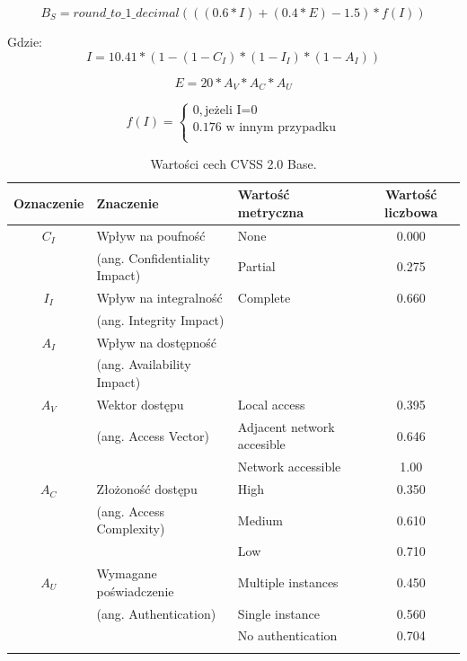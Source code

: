 \begin{equation}
    B_S = round\_to\_1\_decimal(((0.6* I)  +(0.4*E)-1.5)* f(I))
\end{equation}

Gdzie:
\begin{equation}
    I=10.41 * (1 - (1 - C_I) * (1 - I_I) * (1 - A_I))
\end{equation}

\begin{equation}
    E=20 * A_V * A_C * A_U
\end{equation}

\begin{equation}
f(I) = 
\begin{cases}
0,\text{jeżeli I=0} \\
0.176\text{ w innym przypadku} \\
\end{cases}
\end{equation}

\begin{table}[tbh]
\caption{Wartości cech CVSS 2.0 Base.}
\begin{center}
\label{tab:chapter1:cvss_2_property}
\begin{tabular}{cllc}
\hline \noalign {\smallskip}
\textbf{Oznaczenie} & \textbf{Znaczenie} & \textbf{Wartość metryczna} & \textbf{Wartość liczbowa} \\
\hline \noalign {\smallskip}
$C_I$ & Wpływ na poufność         & None          & 0.000 \\
      & (ang. Confidentiality Impact)  & Partial       & 0.275 \\
$I_I$ & Wpływ na integralność     & Complete      & 0.660 \\
      & (ang. Integrity Impact)        &               &       \\
$A_I$ & Wpływ na dostępność       &               &       \\
      & (ang. Availability Impact)     &               &       \\
\hline \noalign {\smallskip}
$A_V$ & Wektor dostępu            & Local access & 0.395 \\
      & (ang. Access Vector)           & Adjacent network accesible & 0.646 \\
      &                           & Network accessible & 1.00 \\
\hline \noalign {\smallskip}
$A_C$ & Złożoność dostępu         & High     & 0.350 \\
      & (ang. Access Complexity)       & Medium	 & 0.610 \\
      &                           & Low	     & 0.710 \\
\hline \noalign {\smallskip}
$A_U$ & Wymagane poświadczenie  & Multiple instances & 0.450 \\
      & (ang. Authentication)        & Single instance & 0.560 \\
	  &                         & No authentication & 0.704 \\
\hline \noalign {\smallskip}

\end{tabular}
\end{center}
\end{table}

